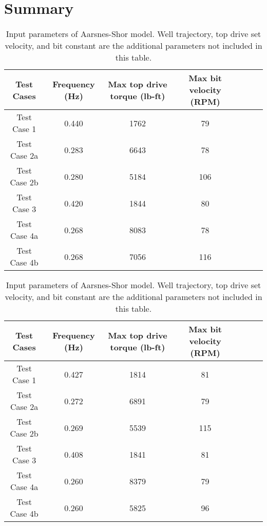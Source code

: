 \section{Summary} 
\begin{table}
    \centering
    \begin{tabular}{|c|c|c|c|c|c|c|}
        \hline
        \textbf{Test Cases} & \textbf{Frequency (Hz)} & \textbf{Max top drive torque (lb-ft)} & \textbf{Max bit velocity (RPM)}\\
        \hline
        Test Case 1 & 0.440 & 1762 & 79\\
        \hline
        Test Case 2a & 0.283 & 6643 & 78\\
        \hline
        Test Case 2b & 0.280 & 5184 & 106\\ 
        \hline
        Test Case 3 & 0.420 & 1844 & 80 \\                                                  
        \hline
        Test Case 4a & 0.268 & 8083 & 78 \\                                                   
        \hline
        Test Case 4b & 0.268 & 7056 & 116\\                                                       
        \hline
    \end{tabular}
    \caption[Input parameters of Aarsnes-Shor model (Python ver.)]{Input parameters of Aarsnes-Shor model. Well trajectory, top drive set velocity, and bit constant are the additional parameters not included in this table.}
    \label{AS_input_params}
\end{table} 

\begin{table}
    \centering
    \begin{tabular}{|c|c|c|c|c|c|c|}
        \hline
        \textbf{Test Cases} & \textbf{Frequency (Hz)} & \textbf{Max top drive torque (lb-ft)} & \textbf{Max bit velocity (RPM)}\\
        \hline
        Test Case 1  & 0.427 & 1814 & 81\\
        \hline
        Test Case 2a  & 0.272 & 6891 & 79\\
        \hline
        Test Case 2b  & 0.269 & 5539 & 115\\ 
        \hline
        Test Case 3  & 0.408 & 1841 & 81\\                                                  
        \hline
        Test Case 4a  & 0.260 & 8379 & 79\\                                                   
        \hline
        Test Case 4b & 0.260 & 5825 & 96\\                                                       
        \hline
    \end{tabular}
    \caption[Input parameters of Aarsnes-Shor model (Python ver.)]{Input parameters of Aarsnes-Shor model. Well trajectory, top drive set velocity, and bit constant are the additional parameters not included in this table.}
    \label{AS_input_params}
\end{table}